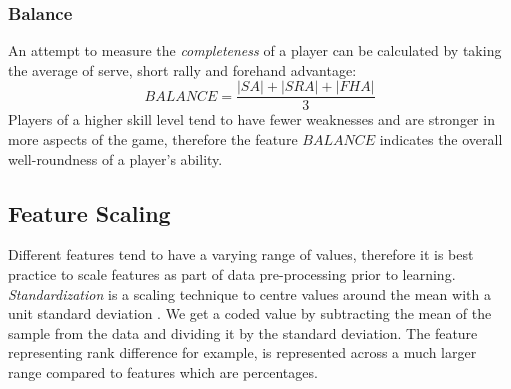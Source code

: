 \subsubsection{Balance} \label{balance}
An attempt to measure the \textit{completeness} of a player can be calculated by taking the average of serve, short rally and forehand advantage:
$$
BALANCE = \frac{|SA|+|SRA|+|FHA|}{3}
$$
Players of a higher skill level tend to have fewer weaknesses and are stronger in more aspects of the game, therefore the feature $BALANCE$ indicates the overall well-roundness of a player's ability. \label{engineer}

\subsection{Feature Scaling}
Different features tend to have a varying range of values, therefore it is best practice to scale features as part of data pre-processing prior to learning. \textit{Standardization} is a scaling technique to centre values around the mean with a unit standard deviation \cite{bollegala2017dynamic}. We get a coded value by subtracting the mean of the sample from the data and dividing it by the standard deviation. The feature representing rank difference for example, is represented across a much larger range compared to features which are percentages.
